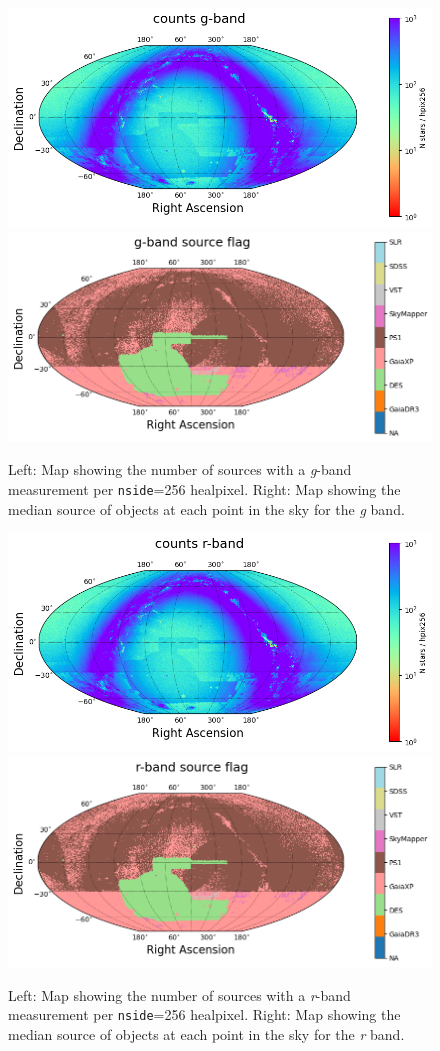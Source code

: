 

\begin{figure}
    \includegraphics[width=0.48\linewidth]{./figures/source_density_maps/g-band_counts_full.png}
    \includegraphics[width=0.48\linewidth]{./figures/source_survey_maps/g-band_source.png}
    \caption{Left: Map showing the number of sources with a \textit{g}-band measurement per \texttt{nside}=256 healpixel.
    Right: Map showing the median source of objects at each point in the sky for the \textit{g} band.}
    \label{fig:monster-g}
\end{figure}
\begin{figure}
    \includegraphics[width=0.48\linewidth]{./figures/source_density_maps/r-band_counts_full.png}
    \includegraphics[width=0.48\linewidth]{./figures/source_survey_maps/r-band_source.png}
    \caption{Left: Map showing the number of sources with a \textit{r}-band measurement per \texttt{nside}=256 healpixel.
    Right: Map showing the median source of objects at each point in the sky for the \textit{r} band.}
    \label{fig:monster-r}
\end{figure}
